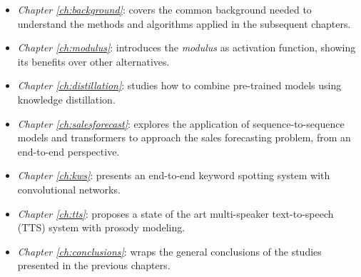 \begin{itemize}
	\item \textit{Chapter \ref{ch:background}}: covers the common background needed to understand the methods and algorithms applied in the subsequent chapters.
	\item \textit{Chapter \ref{ch:modulus}}: introduces the \textit{modulus} as activation function, showing its benefits over other alternatives.
	\item \textit{Chapter \ref{ch:distillation}}: studies how to combine pre-trained models using knowledge distillation.
	\item \textit{Chapter \ref{ch:salesforecast}}: explores the application of sequence-to-sequence models and transformers to approach the sales forecasting problem, from an end-to-end perspective. 
	\item \textit{Chapter \ref{ch:kws}}: presents an end-to-end keyword spotting system with convolutional networks.
	\item \textit{Chapter \ref{ch:tts}}: proposes a state of the art multi-speaker text-to-speech (TTS) system with prosody modeling.
	\item \textit{Chapter \ref{ch:conclusions}}: wraps the general conclusions of the studies presented in the previous chapters.
\end{itemize}


     


